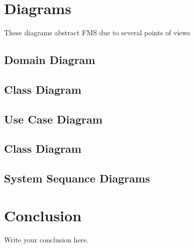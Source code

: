 \documentclass{article}
\begin{document}
\section {Diagrams}
These diagrams abstract FMS due to several points of views
\subsection{Domain Diagram}
\subsection{Class Diagram}
\subsection{Use Case Diagram}
\subsection{Class Diagram}
\subsection{System Sequance Diagrams}

\section{Conclusion}
Write your conclusion here.
\end{document}
